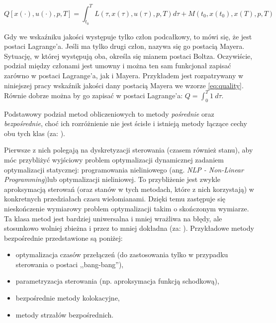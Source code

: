 \begin{equation}\label{eq:num-oc-quality}
Q[x(\cdot), u(\cdot), p, T] = \int_{t_{0}}^{T}L(\tau, x(\tau), u(\tau), p, T)d\tau + M(t_{0}, x(t_{0}), x(T), p, T)
\end{equation}

Gdy we wskaźniku jakości występuje tylko człon podcałkowy, to mówi się, że jest postaci Lagrange'a. Jeśli ma tylko drugi człon, nazywa się go postacią Mayera. Sytuację, w której występują oba, określa się mianem postaci Boltza. Oczywiście, podział między członami jest umowny i można ten sam funkcjonał zapisać zarówno w postaci Lagrange'a, jak i Mayera. Przykładem jest rozpatrywany w niniejszej pracy wskaźnik jakości dany postacią Mayera we wzorze \ref{eq:quality}. Równie dobrze można by go zapisać w postaci Lagrange'a: $Q = \int_{0}^{T} 1 ~d\tau$.

Podstawowy podział metod obliczeniowych to metody \emph{pośrednie} oraz \emph{bezpośrednie}, choć ich rozróżnienie nie jest ścisłe i istnieją metody łączące cechy obu tych klas (za: \cite{Betts98}).

Pierwsze z nich polegają na dyskretyzacji sterowania (czasem również stanu), aby móc przybliżyć wyjściowy problem optymalizacji dynamicznej zadaniem optymalizacji statycznej: programowania nieliniowego (ang. \emph{NLP - Non-Linear Programming})lub optymalizacji nieliniowej. To przybliżenie jest zwykle aproksymacją sterowań (oraz stanów w tych metodach, które z nich korzystają) w konkretnych przedziałach czasu wielomianami. Dzięki temu zastępuje się nieskończenie wymiarowy problem optymalizacji takim o skończonym wymiarze. Ta klasa metod jest bardziej uniwersalna i mniej wrażliwa na błędy, ale stosunkowo wolniej zbieżna i przez to mniej dokładna (za: \cite{Korytowski2015}). Przykładowe metody bezpośrednie przedstawione są poniżej:
\begin{itemize}
    \item optymalizacja czasów przełączeń (do zastosowania tylko w przypadku sterowania o postaci ,,bang-bang''),
    \item parametryzacja sterowania (np. aproksymacja funkcją schodkową),
    \item bezpośrednie metody kolokacyjne,
    \item metody strzałów bezpośrednich.
\end{itemize}


